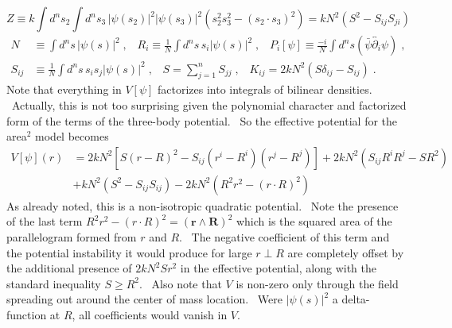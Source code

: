 \documentclass[a4paper,12pt]{article}%
\begin{document}
\[
Z\equiv k\int d^{n}s_{2}\int d^{n}s_{3}\,\left|  \psi\left(  s_{2}\right)
\right|  ^{2}\left|  \psi\left(  s_{3}\right)  \right|  ^{2}\left(  s_{2}%
^{2}s_{3}^{2}-\left(  s_{2}\cdot s_{3}\right)  ^{2}\right)  =kN^{2}\left(
S^{2}-S_{ij}S_{ji}\right)
\]%
\begin{align*}
N  &  \equiv%
{\textstyle\int}
d^{n}s\,\left|  \psi\left(  s\right)  \right|  ^{2}\;,\;\;\;R_{i}%
\equiv\frac{1}{N}%
{\textstyle\int}
d^{n}s\,s_{i}\left|  \psi\left(  s\right)  \right|  ^{2}\;,\;\;\;P_{i}\left[
\psi\right]  \equiv\frac{-i}{N}%
{\textstyle\int}
d^{n}s\left(  \bar{\psi}\overleftrightarrow{\partial_{i}}\psi\right)  \;,\\
S_{ij}  &  \equiv\frac{1}{N}%
{\textstyle\int}
d^{n}s\,s_{i}s_{j}\left|  \psi\left(  s\right)  \right|  ^{2}\;,\;\;\;S=\sum
_{j=1}^{n}S_{jj}\;,\;\;\;K_{ij}=2kN^{2}\left(  S\delta_{ij}-S_{ij}\right)  \;.
\end{align*}
Note that everything in $V\left[  \psi\right]  $ factorizes into integrals of
bilinear densities. \ Actually, this is not too surprising given the
polynomial character and factorized form of the terms of the three-body
potential. \ So the effective potential for the area$^{2}$ model becomes
\begin{align*}
V\left[  \psi\right]  \left(  r\right)   &  =2kN^{2}\left[  S\left(
r-R\right)  ^{2}-S_{ij}\left(  r^{i}-R^{i}\right)  \left(  r^{j}-R^{j}\right)
\right]  +2kN^{2}\left(  S_{ij}R^{i}R^{j}-SR^{2}\right) \\
&  +kN^{2}\left(  S^{2}-S_{ij}S_{ij}\right)  -2kN^{2}\left(  R^{2}%
r^{2}-\left(  r\cdot R\right)  ^{2}\right)
\end{align*}
As already noted, this is a non-isotropic quadratic potential. \ Note the
presence of the last term $R^{2}r^{2}-\left(  r\cdot R\right)  ^{2}=\left(
\mathbf{r}\wedge\mathbf{R}\right)  ^{2}$ which is the squared area of the
parallelogram formed from $r$ and $R$. \ The negative coefficient of this term
and the potential instability it would produce for large $r\perp R$ are
completely offset by the additional presence of $2kN^{2}Sr^{2}$ in the
effective potential, along with the standard inequality $S\geq R^{2}$. \ Also
note that $V$ is non-zero only through the field spreading out around the
center of mass location. \ Were $\left|  \psi\left(  s\right)  \right|  ^{2}$
a delta-function at $R$, all coefficients would vanish in $V$.
\end{document}
